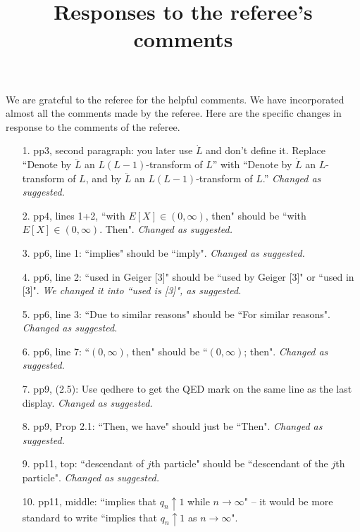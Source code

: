 \documentclass[12pt,a4paper]{amsart}
\title[Responses]{\large Responses to the referee's comments}
\numberwithin{equation}{section}
\begin{document}
\maketitle	
	We are grateful to the referee for the helpful comments.
	We have incorporated almost all the comments made by the referee.
	Here are the specific changes in response to the comments of the referee.
\\
\begin{itemize}
\item[1.]
	pp3, second paragraph: you later use $\dot L$  and don't define it. 
	Replace ``Denote by $\ddot L$ an $L(L-1)$-transform of $L$” with ``Denote by $\dot L$ an $L$-transform of $L$, and by $\ddot L$ an $L(L-1)$-transform of $L$.”
	{\it Changed as suggested.}
\\
\item [2.]
	pp4, lines 1+2, ``with $E[X] \in (0, \infty)$, then" should be ``with $E[X] \in (0, \infty)$. Then".
	{\it Changed as suggested.}
\\
\item [3.]
	pp6, line 1: ``implies" should be ``imply".
	{\it Changed as suggested.}
\\
\item[4.]
	pp6, line 2: ``used in Geiger [3]" should be ``used by Geiger [3]" or ``used in [3]".
	{\it We changed it into ``used is [3]", as suggested.}
\\
\item[5.]
	pp6, line 3: ``Due to similar reasons" should be ``For similar reasons".
	{\it Changed as suggested.}
\\
\item[6.]
	pp6, line 7: ``$(0, \infty)$, then" should be ``$(0, \infty)$; then".
	{\it Changed as suggested.}
\\
\item[7.]
	pp9, (2.5): Use qedhere to get the QED mark on the same line as the last display.
	{\it Changed as suggested.}
\\
\item[8.]
	pp9, Prop 2.1: ``Then, we have" should just be ``Then".
	{\it Changed as suggested.}
\\
\item[9.]
	pp11, top: ``descendant of $j$th particle" should be ``descendant of the $j$th particle".
	{\it Changed as suggested.}
\\
\item[10.]
	pp11, middle: ``implies that $q_n \uparrow 1$ while $n \to \infty$" -- it would be more standard to write ``implies that $q_n \uparrow 1$ as $n \to \infty$".

\end{itemize}
\end{document}
